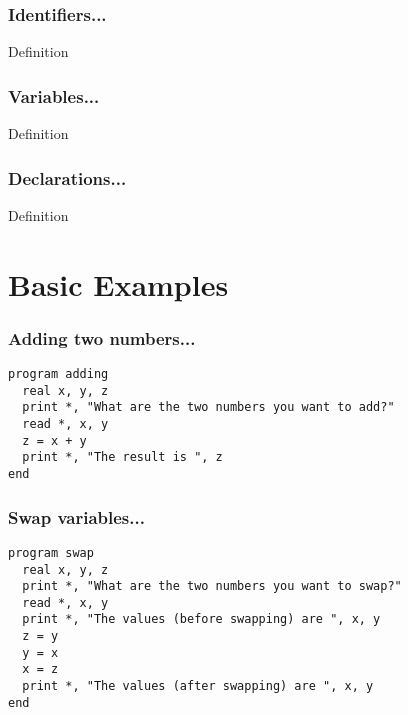 \documentclass[xcolor=dvipsnames,dvip,notes=show,table]{beamer}
\begin{document}
\begin{frame}[fragile]
\frametitle{Identifiers...}
\scriptsize
  \begin{exampleblock}{Definition}
 \end{exampleblock}
 
\end{frame}



\begin{frame}[fragile]
\frametitle{Variables...}
\scriptsize
  \begin{exampleblock}{Definition}
 \end{exampleblock}
 
\end{frame}


\begin{frame}[fragile]
\frametitle{Declarations...}
\scriptsize
  \begin{exampleblock}{Definition}
 \end{exampleblock}
 
\end{frame}


\section{Basic Examples}

% 


\begin{frame}[fragile]
\frametitle{Adding two numbers...}
\scriptsize
\begin{lstlisting}
program adding
  real x, y, z
  print *, "What are the two numbers you want to add?"
  read *, x, y  
  z = x + y
  print *, "The result is ", z
end
\end{lstlisting}
\end{frame}



\begin{frame}[fragile]
\frametitle{Swap variables...}

\scriptsize
\begin{lstlisting}
program swap
  real x, y, z
  print *, "What are the two numbers you want to swap?"
  read *, x, y
  print *, "The values (before swapping) are ", x, y
  z = y
  y = x
  x = z
  print *, "The values (after swapping) are ", x, y
end
\end{lstlisting}
\end{frame}
\end{document}
